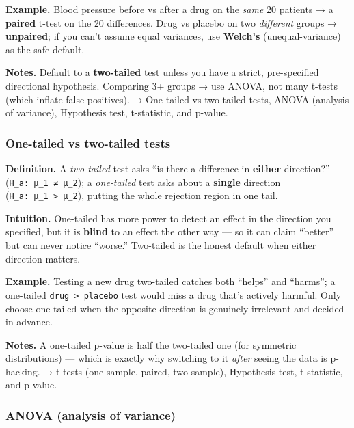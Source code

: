 \documentclass[
  10pt,
  letterpaper,
  onecolumn]{article}
\begin{document}
\textbf{Example.} Blood pressure before vs after a drug on the
\emph{same} 20 patients → a \textbf{paired} t-test on the 20
differences. Drug vs placebo on two \emph{different} groups →
\textbf{unpaired}; if you can't assume equal variances, use
\textbf{Welch's} (unequal-variance) as the safe default.

\textbf{Notes.} Default to a \textbf{two-tailed} test unless you have a
strict, pre-specified directional hypothesis. Comparing 3+ groups → use
ANOVA, not many t-tests (which inflate false positives). → One-tailed vs
two-tailed tests, ANOVA (analysis of variance), Hypothesis test,
t-statistic, and p-value.

\hypertarget{one-tailed-vs-two-tailed-tests}{%
\subsubsection{One-tailed vs two-tailed
tests}\label{one-tailed-vs-two-tailed-tests}}

\textbf{Definition.} A \emph{two-tailed} test asks ``is there a
difference in \textbf{either} direction?''
(\texttt{H\_a:\ μ\_1\ ≠\ μ\_2}); a \emph{one-tailed} test asks about a
\textbf{single} direction (\texttt{H\_a:\ μ\_1\ \textgreater{}\ μ\_2}),
putting the whole rejection region in one tail.

\textbf{Intuition.} One-tailed has more power to detect an effect in the
direction you specified, but it is \textbf{blind} to an effect the other
way --- so it can claim ``better'' but can never notice ``worse.''
Two-tailed is the honest default when either direction matters.

\textbf{Example.} Testing a new drug two-tailed catches both ``helps''
and ``harms''; a one-tailed \texttt{drug\ \textgreater{}\ placebo} test
would miss a drug that's actively harmful. Only choose one-tailed when
the opposite direction is genuinely irrelevant and decided in advance.

\textbf{Notes.} A one-tailed p-value is half the two-tailed one (for
symmetric distributions) --- which is exactly why switching to it
\emph{after} seeing the data is p-hacking. → t-tests (one-sample,
paired, two-sample), Hypothesis test, t-statistic, and p-value.

\hypertarget{anova-analysis-of-variance}{%
\subsubsection{ANOVA (analysis of
variance)}\label{anova-analysis-of-variance}}
\end{document}
